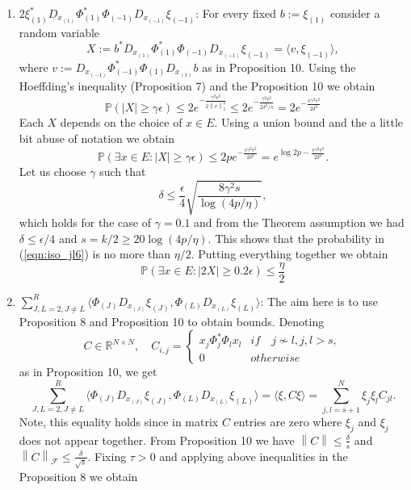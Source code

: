 \documentclass[twoside,11pt]{article}
\newcommand\norm[1]{\left\lVert#1\right\rVert}
\newcommand*\by{{\times}}
\begin{document}
\begin{enumerate}
    \item $2 \xi_{(1)}^* D_{x_{(1)}} \Phi_{(1)}^* \Phi_{(-1)} D_{x_{(-1)}} \xi_{(-1)}$: For every fixed $b := \xi_{(1)}$ consider a random variable
    $$
    X := b^*D_{x_{(1)}} \Phi_{(1)}^* \Phi_{(-1)} D_{x_{(-1)}} \xi_{(-1)} = \langle v, \xi_{(-1)} \rangle,
    $$
    where $v := D_{x_{(-1)}} \Phi_{(-1)}^* \Phi_{(1)} D_{x_{(1)}} b$ as in Proposition 10. Using the Hoeffding's inequality (Proposition 7) and the Proposition 10 we obtain
    \begin{equation}
        \label{eqn:iso_jl6}
        \mathbb{P}(|X| \geq \gamma \epsilon) \leq 2 e^{-\frac{\gamma^2 \epsilon^2}{2 \norm{v}_2^2}} \leq 2e^{-\frac{\gamma^2 \epsilon^2}{2 \delta^2/s}} = 2e^{-\frac{s \gamma^2 \epsilon^2}{2 \delta^2} }
    \end{equation}
    Each $X$ depends on the choice of $x \in E$. Using a union bound and the a little bit abuse of notation we obtain
    $$
    \mathbb{P}(\exists x \in E: |X| \geq \gamma \epsilon) \leq 
    2pe^{-\frac{s \gamma^2 \epsilon^2}{2 \delta^2} } = 
    e^{ \log{2p} -\frac{s \gamma^2 \epsilon^2}{2 \delta^2} }.
    $$
    Let us choose $\gamma$ such that 
    $$
    \delta \leq \frac{\epsilon}{4}\sqrt{\frac{8 \gamma^2 s}{\log(4p/\eta)}},
    $$
    which holds for the case of $\gamma = 0.1$ and from the Theorem assumption we had $\delta \leq \epsilon/4$ and $s = k/2 \geq 20\log(4p/\eta)$. This shows that the probability in (\ref{eqn:iso_jl6}) is no more than $\eta/2$. Putting everything together we obtain
    \begin{equation}
        \label{eqn:iso_jl7}
        \mathbb{P}(\exists x \in E: |2X| \geq 0.2 \epsilon) \leq \frac{\eta}{2}
    \end{equation}
    \item $\sum_{J,L = 2, J \not = L }^R \langle \Phi_{(J)} D_{x_{(J)}} \xi_{(J)}, \Phi_{(L)} D_{x_{(L)}} \xi_{(L)} \rangle$: The aim here is to use Proposition 8 and Proposition 10 to obtain bounds. Denoting
    $$
    C \in \mathbb{R}^{N \by N}, \quad C_{i,j} =
    \begin{cases} 
    x_j \Phi_j^*\Phi_l x_l & if \quad j \not \sim l, j,l > s, \\
    0 & otherwise
    \end{cases}
    $$
    as in Proposition 10, we get
    $$
    \sum_{J,L = 2, J \not = L }^R \langle \Phi_{(J)} D_{x_{(J)}} \xi_{(J)}, \Phi_{(L)} D_{x_{(L)}} \xi_{(L)} \rangle = 
    \langle \xi, C \xi \rangle = 
    \sum_{j,l = s+1}^N \xi_j \xi_l C_{jl}.
    $$
    Note, this equality holds since in matrix $C$ entries are zero where $\xi_j$ and $\xi_j$ does not appear together. From Proposition 10 we have $\norm{C} \leq \frac{\delta}{s}$ and $\norm{C}_{\mathcal{F}} \leq \frac{\delta}{\sqrt{s}}$. Fixing $\tau > 0$ and applying above inequalities in the Proposition 8 we obtain

\end{enumerate}
\end{document}
